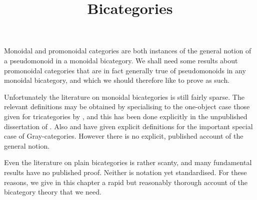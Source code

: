 
\newcommand\defeqto{=}

\title{Bicategories}

\maketitle

Monoidal and promonoidal categories are both instances of the
general notion of a pseudomonoid in a monoidal bicategory. We
shall need some results about promonoidal categories that are
in fact generally true of pseudomonoids in any monoidal bicategory,
and which we should therefore like to prove as such.

Unfortunately the literature on monoidal bicategories is still fairly sparse.
The relevant definitions may be obtained by specialising to the one-object
case those given for tricategories by \citet{GPS}, and this has been done
explicitly in the unpublished dissertation of \citet{CarmodyThesis}.
Also \citet{MonBicat} and \citet{HDA1} have given explicit definitions for
the important special case of Gray-categories. However there is no explicit,
published account of the general notion.

Even the literature on plain bicategories is rather scanty, and many
fundamental results have no published proof. Neither is notation
yet standardised. For these reasons, we give in this chapter a rapid
but reasonably thorough account of the bicategory theory that we need.

